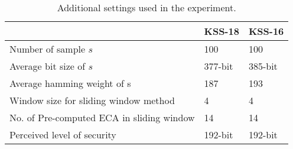 \renewcommand{\arraystretch}{1.5}{
\begin{table}[ht]
\centering
\caption{ Computational environment.}
\label{table_comenv_twist_chap_ijnc2017}
\end{table}
}

\renewcommand{\arraystretch}{1.3}{
\begin{table}[ht]
	\begin{center}
		\caption{Additional settings used in the experiment.}
		\label{table_additional_twist_chap_ijnc2017}
		\begin{tabular}{l|l|l}
			\hline 
			 & KSS-18 & KSS-16 \\ \hline
			 Number of sample $s$& 100 & 100\\ \hline
			 Average bit size  of $s$ & 377-bit & 385-bit\\ \hline
			 Average hamming weight of s & 187 & 193\\ \hline
			 Window size for sliding window method & 4 & 4\\ \hline 
			  No. of Pre-computed ECA in sliding window  & 14 & 14\\ \hline 
			  Perceived level of security & 192-bit & 192-bit\\ \hline
		\end{tabular}
	\end{center}
\end{table}
}
 
